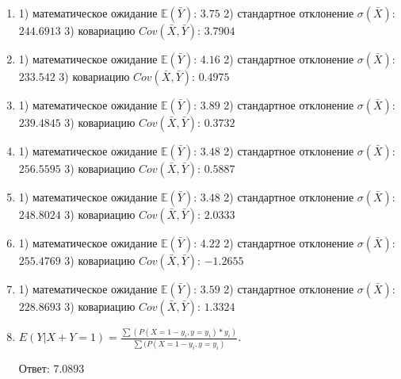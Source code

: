 \documentclass[a4paper,12pt]{article}
\begin{document}
\begin{enumerate}
\item


1) математическое ожидание $\mathbb{E}(\bar Y)$: $3.75$ 
2) стандартное отклонение $\sigma(\bar X)$: $244.6913$
3) ковариацию $Cov(\bar X, \bar Y)$: $3.7904$



\item


1) математическое ожидание $\mathbb{E}(\bar Y)$: $4.16$ 
2) стандартное отклонение $\sigma(\bar X)$: $233.542$
3) ковариацию $Cov(\bar X, \bar Y)$: $0.4975$



\item


1) математическое ожидание $\mathbb{E}(\bar Y)$: $3.89$ 
2) стандартное отклонение $\sigma(\bar X)$: $239.4845$
3) ковариацию $Cov(\bar X, \bar Y)$: $0.3732$



\item


1) математическое ожидание $\mathbb{E}(\bar Y)$: $3.48$ 
2) стандартное отклонение $\sigma(\bar X)$: $256.5595$
3) ковариацию $Cov(\bar X, \bar Y)$: $0.5887$



\item


1) математическое ожидание $\mathbb{E}(\bar Y)$: $3.48$ 
2) стандартное отклонение $\sigma(\bar X)$: $248.8024$
3) ковариацию $Cov(\bar X, \bar Y)$: $2.0333$



\item


1) математическое ожидание $\mathbb{E}(\bar Y)$: $4.22$ 
2) стандартное отклонение $\sigma(\bar X)$: $255.4769$
3) ковариацию $Cov(\bar X, \bar Y)$: $-1.2655$



\item


1) математическое ожидание $\mathbb{E}(\bar Y)$: $3.59$ 
2) стандартное отклонение $\sigma(\bar X)$: $228.8693$
3) ковариацию $Cov(\bar X, \bar Y)$: $1.3324$



\item

    
        $E(Y|X+Y=1) = \frac{\sum(P(X=1 - y_i, y=y_i) * y_i)}{\sum(P(X=1 - y_i, y=y_i)}$.

        Ответ: $7.0893$
    



\end{enumerate}
\end{document}
